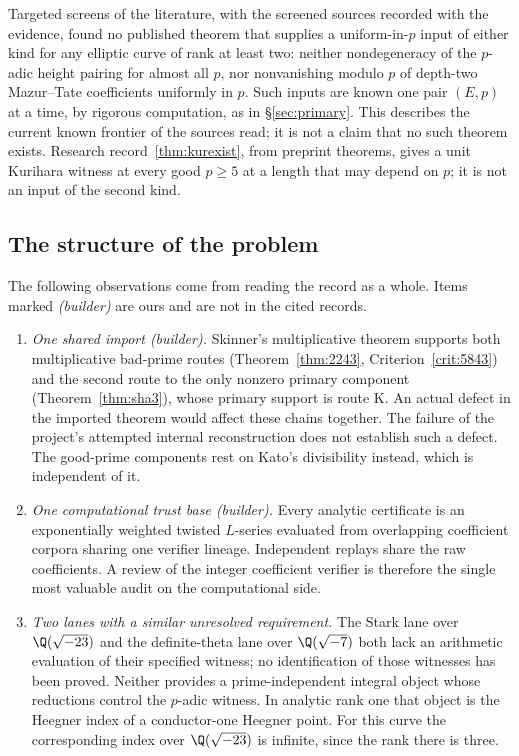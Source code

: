 Targeted screens of the literature, with the screened sources recorded with the evidence, found no published theorem that supplies a uniform-in-$p$ input of either kind for any elliptic curve of rank at least two: neither nondegeneracy of the $p$-adic height pairing for almost all $p$, nor nonvanishing modulo $p$ of depth-two Mazur--Tate coefficients uniformly in $p$. Such inputs are known one pair $(E,p)$ at a time, by rigorous computation, as in \S\ref{sec:primary}. This describes the current known frontier of the sources read; it is not a claim that no such theorem exists. Research record~\ref{thm:kurexist}, from preprint theorems, gives a unit Kurihara witness at every good $p\ge5$ at a length that may depend on $p$; it is not an input of the second kind.

\subsection{The structure of the problem}
The following observations come from reading the record as a whole. Items marked \emph{(builder)} are ours and are not in the cited records.

\begin{enumerate}[label=(\alph*),leftmargin=*]
\item \emph{One shared import (builder).} Skinner's multiplicative theorem supports both multiplicative bad-prime routes (Theorem~\ref{thm:2243}, Criterion~\ref{crit:5843}) and the second route to the only nonzero primary component (Theorem~\ref{thm:sha3}), whose primary support is route K. An actual defect in the imported theorem would affect these chains together. The failure of the project's attempted internal reconstruction does not establish such a defect. The good-prime components rest on Kato's divisibility instead, which is independent of it.

\item \emph{One computational trust base (builder).} Every analytic certificate is an exponentially weighted twisted $L$-series evaluated from overlapping coefficient corpora sharing one verifier lineage. Independent replays share the raw coefficients. A review of the integer coefficient verifier is therefore the single most valuable audit on the computational side.

\item \emph{Two lanes with a similar unresolved requirement.} The Stark lane over $\Q(\sqrt{-23})$ and the definite-theta lane over $\Q(\sqrt{-7})$ both lack an arithmetic evaluation of their specified witness; no identification of those witnesses has been proved. Neither provides a prime-independent integral object whose reductions control the $p$-adic witness. In analytic rank one that object is the Heegner index of a conductor-one Heegner point. For this curve the corresponding index over $\Q(\sqrt{-23})$ is infinite, since the rank there is three.
\end{enumerate}

